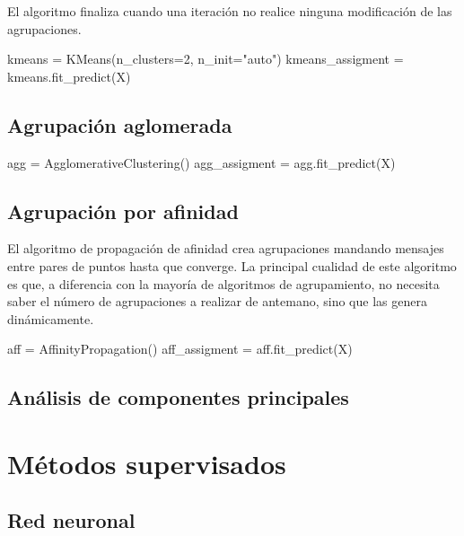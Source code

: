 El algoritmo finaliza cuando una iteración no realice ninguna modificación de las agrupaciones.

\begin{mypython}[float={h},caption={k-medias.}]
    kmeans = KMeans(n_clusters=2, n_init="auto")
kmeans_assigment = kmeans.fit_predict(X)
\end{mypython}

\subsection{Agrupación aglomerada}

\begin{mypython}[float={h},caption={Propagación de afinidad.}]
    agg = AgglomerativeClustering()
    agg_assigment = agg.fit_predict(X)
\end{mypython}

\subsection{Agrupación por afinidad}

El algoritmo de propagación de afinidad crea agrupaciones mandando mensajes entre pares de puntos hasta que converge. La principal cualidad de este algoritmo es que, a diferencia con la mayoría de algoritmos de agrupamiento, no necesita saber el número de agrupaciones a realizar de antemano, sino que las genera dinámicamente.

\begin{mypython}[float={h},caption={Propagación de afinidad.}]
    aff = AffinityPropagation()
    aff_assigment = aff.fit_predict(X)
\end{mypython}

\subsection{Análisis de componentes principales}

\section{Métodos supervisados}
\cite[Deep Learning with PyTorch]{pytorch}
\subsection{Red neuronal}